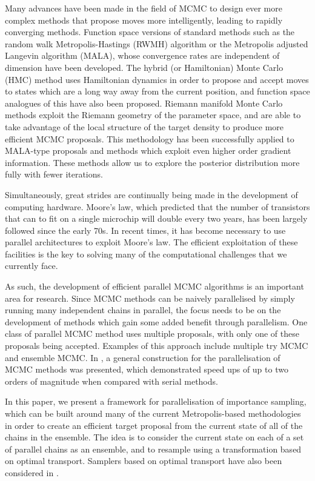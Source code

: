 \documentclass[final]{siamltex}
\begin{document}
Many advances have been made in the field of MCMC to design ever more
complex methods that propose moves more intelligently, leading to
rapidly converging methods. Function space versions of standard methods
such as the random walk Metropolis-Hastings (RWMH) algorithm or the
Metropolis adjusted Langevin algorithm (MALA), whose convergence rates
are independent of dimension have been
developed\cite{cotter2013mcmc}. The hybrid (or Hamiltonian) Monte
Carlo (HMC) method uses Hamiltonian dynamics in order to propose and
accept moves to states which are a long way away from the current
position\cite{sexton1992hamiltonian}, and function space analogues of
this have also been proposed\cite{beskos2011hybrid}. Riemann
manifold Monte Carlo methods exploit the Riemann geometry of the
parameter space, and are able to take advantage of the local structure
of the target density to produce more efficient MCMC
proposals\cite{girolami2011riemann}. This methodology has been
successfully applied to MALA-type proposals and methods which exploit
even higher order gradient information\cite{bui2014solving}.  These
methods allow us to explore the posterior distribution more fully 
with fewer iterations.

Simultaneously, great strides are continually being made in the
development of computing hardware. Moore's law, which predicted that
the number of transistors that can to fit on a single microchip will
double every two years, has been largely followed since the early
70s\cite{moore1998cramming}. In recent times, it has become necessary
to use parallel architectures to exploit Moore's law. The efficient
exploitation of these facilities is the key to solving many of the
computational challenges that we currently face.

As such, the development of efficient parallel MCMC algorithms is an
important area for research. Since MCMC methods can be naively
parallelised by simply running many independent chains in parallel,
the focus needs to be on the development of methods which gain some
added benefit through parallelism. One class of parallel MCMC method
uses multiple proposals, with only one of these proposals being
accepted. Examples of this approach include multiple try
MCMC\cite{liu2000multiple} and ensemble MCMC\cite{neal2011mcmc}. In
\cite{calderhead2014general}, a general construction for the
parallelisation of MCMC methods was presented, which demonstrated
speed ups of up to two orders of magnitude when compared with serial methods.

In this paper, we present a framework for parallelisation of
importance sampling, which can be built around many of the current
Metropolis-based methodologies in order to create an efficient target
proposal from the current state of all of the chains in the
ensemble. The idea is to consider the current state on each of a set of
parallel chains as an ensemble, and to resample using a transformation
based on optimal transport. Samplers based on optimal transport
have also been considered in \cite{el2012bayesian}.
\end{document}
